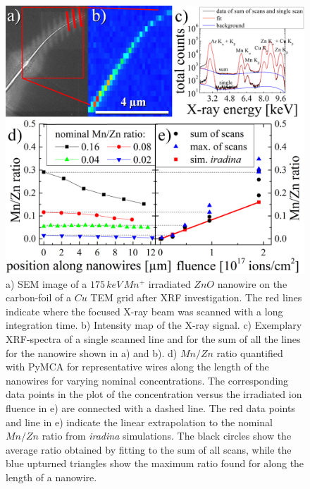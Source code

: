 \begin{figure}[H]
	\centering
		\includegraphics[width=.7\textwidth]{images/largeXRF.png}
	\caption{a) SEM image of a $175\,keV\,Mn^+$ irradiated $ZnO$ nanowire on the carbon-foil of a $Cu$ TEM grid after XRF investigation. The red lines indicate where the focused X-ray beam was scanned with a long integration time. b) Intensity map of the X-ray signal. c) Exemplary XRF-spectra of a single scanned line and for the sum of all the lines for the nanowire shown in a) and b). d) $Mn/Zn$ ratio quantified with PyMCA for representative wires along the length of the nanowires for varying nominal concentrations. The corresponding data points in the plot of the concentration versus the irradiated ion fluence in e) are connected with a dashed line. The red data points and line in e) indicate the linear extrapolation to the nominal $Mn/Zn$ ratio from \emph{iradina} simulations. The black circles show the average ratio obtained by fitting to the sum of all scans, while the blue upturned triangles show the maximum ratio found for along the length of a nanowire.} 
	\label{largeXRF}
\end{figure} 


